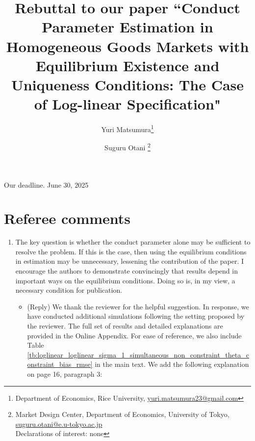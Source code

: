 \documentclass[11pt, a4paper]{article}
\title{Rebuttal to our paper ``Conduct Parameter Estimation in Homogeneous Goods Markets with Equilibrium Existence and Uniqueness Conditions: The Case of Log-linear Specification"}
\author{Yuri Matsumura\thanks{Department of Economics, Rice University, \href{mailto:}{yuri.matsumura23@gmail.com}} \and Suguru Otani \thanks{Market Design Center, Department of Economics, University of Tokyo, \href{mailto:}{suguru.otani@e.u-tokyo.ac.jp}
\\Declarations of interest: none %
}}
\theoremstyle{remark}
\begin{document}
\maketitle

\bigskip

Our deadline. June 30, 2025

\section{Referee comments}
\begin{enumerate}
    \item The key question is whether the conduct parameter alone may be sufficient to resolve the problem. If this is the case, then using the equilibrium conditions in estimation may be unnecessary, lessening the contribution of the paper. I encourage the authors to demonstrate convincingly that results depend in important ways on the equilibrium conditions. Doing so is, in my view, a necessary condition for publication.
    \begin{itemize}
        \item (Reply) We thank the reviewer for the helpful suggestion. In response, we have conducted additional simulations following the setting proposed by the reviewer. The full set of results and detailed explanations are provided in the Online Appendix. For ease of reference, we also include Table \ref{tb:loglinear_loglinear_sigma_1_simultaneous_non_constraint_theta_constraint_bias_rmse} in the main text. We add the following explanation on page 16, paragraph 3:
        

\end{itemize}
\end{enumerate}
\end{document}
